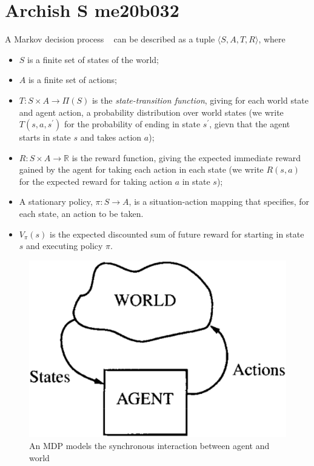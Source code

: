\section{Archish S me20b032}
A Markov decision process ~\cite{POMDP} can be described as a tuple $ \langle S, A, T, R \rangle $, where
\begin{itemize}
	\item $S$ is a finite set of states of the world;
	\item $A$ is a finite set of actions;
	\item $T : S \times A \rightarrow \Pi(S)$ is the \textit{state-transition function}, giving for each world state and agent action, a probability distribution over world states (we write $T(s,a,s^\prime)$ for the probability of ending in state $s^\prime$, gievn that the agent starts in state $s$ and takes action $a$);
	\item $R : S \times A \rightarrow \mathbb{R}$ is the reward function, giving the expected immediate reward gained by the agent for taking each action in each state (we write $R(s,a)$ for the expected reward for taking action $a$ in state $s$);
	\item A stationary policy, $ \pi : S \rightarrow A $, is a situation-action mapping that specifies, for each state, an action to be taken.
	\item $V_{\pi}(s)$ is the expected discounted sum of future reward for starting in state $s$ and executing policy $\pi$.
\end{itemize}

\begin{center}
\begin{figure}[h]
	\includegraphics[width=\linewidth]{me20b032/me20b032.eps}
  	\caption{An MDP models the synchronous interaction between agent and world}
	\label{fig:MDP}
\end{figure}
\end{center}


